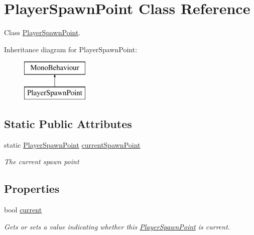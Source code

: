 \hypertarget{class_player_spawn_point}{}\section{Player\+Spawn\+Point Class Reference}
\label{class_player_spawn_point}


Class \hyperlink{class_player_spawn_point}{Player\+Spawn\+Point}.  


Inheritance diagram for Player\+Spawn\+Point\+:\begin{figure}[H]
\begin{center}
\leavevmode
\includegraphics[height=2.000000cm]{class_player_spawn_point}
\end{center}
\end{figure}
\subsection*{Static Public Attributes}
\begin{DoxyCompactItemize}
\item 
static \hyperlink{class_player_spawn_point}{Player\+Spawn\+Point} \hyperlink{class_player_spawn_point_acb5190cac21b1663f0cd6e2c18ec379d}{current\+Spawn\+Point}
\begin{DoxyCompactList}\small\item\em The current spawn point \end{DoxyCompactList}\end{DoxyCompactItemize}
\subsection*{Properties}
\begin{DoxyCompactItemize}
\item 
bool \hyperlink{class_player_spawn_point_ae5c1307f57aef3291b3190541bb0c0cf}{current}
\begin{DoxyCompactList}\small\item\em Gets or sets a value indicating whether this \hyperlink{class_player_spawn_point}{Player\+Spawn\+Point} is current. \end{DoxyCompactList}\end{DoxyCompactItemize}


